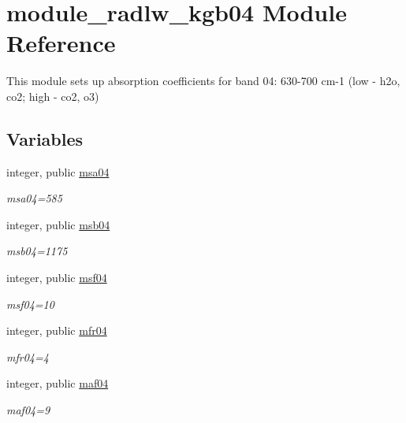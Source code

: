 \hypertarget{namespacemodule__radlw__kgb04}{}\section{module\+\_\+radlw\+\_\+kgb04 Module Reference}
\label{namespacemodule__radlw__kgb04}


This module sets up absorption coefficients for band 04\+: 630-\/700 cm-\/1 (low -\/ h2o, co2; high -\/ co2, o3)  


\subsection*{Variables}
\begin{DoxyCompactItemize}
\item 
\mbox{\label{namespacemodule__radlw__kgb04_ac8c5caff005fd04d01009dd9e977d570}} 
integer, public \hyperlink{namespacemodule__radlw__kgb04_ac8c5caff005fd04d01009dd9e977d570}{msa04}
\begin{DoxyCompactList}\small\item\em msa04=585 \end{DoxyCompactList}\item 
integer, public \hyperlink{group__module__radlw__kgbnn_gab9ce0111a156f7b80f2adaa9f3e84a32}{msb04}
\begin{DoxyCompactList}\small\item\em msb04=1175 \end{DoxyCompactList}\item 
integer, public \hyperlink{group__module__radlw__kgbnn_ga4b38dd1165aca80e19697df7ae74a27a}{msf04}
\begin{DoxyCompactList}\small\item\em msf04=10 \end{DoxyCompactList}\item 
integer, public \hyperlink{group__module__radlw__kgbnn_gab6ae25b4a793bf78ccd504685d639039}{mfr04}
\begin{DoxyCompactList}\small\item\em mfr04=4 \end{DoxyCompactList}\item 
integer, public \hyperlink{group__module__radlw__kgbnn_ga60ff35def4e526c7d9cf3ec88bdd4485}{maf04}
\begin{DoxyCompactList}\small\item\em maf04=9 \end{DoxyCompactList}\item 

\end{DoxyCompactItemize}
